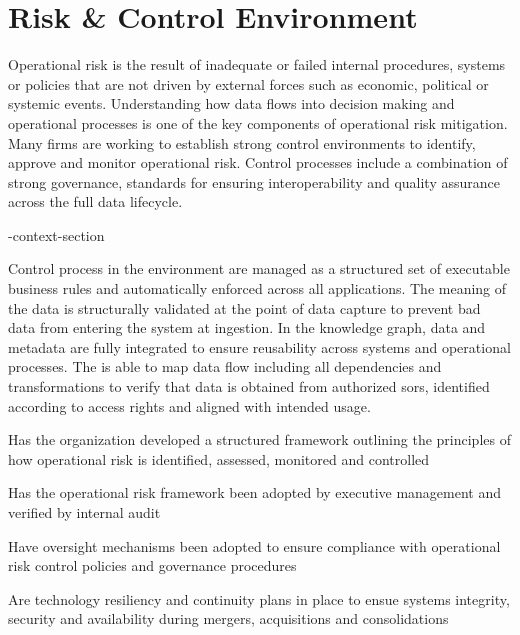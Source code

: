 \section{Risk \& Control Environment}\label{sec:ekgmm-b-4-6} %

Operational risk is the result of inadequate or failed internal procedures,
systems or policies that are not driven by external forces such as economic, political or systemic events.
Understanding how data flows into decision making and operational processes is one of the key components of
operational risk mitigation.
Many firms are working to establish strong control environments to identify, approve and monitor operational risk.
Control processes include a combination of strong governance, standards for ensuring interoperability and
quality assurance across the full data lifecycle.

\ekgmm-context-section

Control process in the  environment are managed as a structured set of executable business rules
and automatically enforced across all applications.
The meaning of the data is structurally validated at the point of data capture to prevent bad data from
entering the system at ingestion.
In the knowledge graph, data and metadata are fully integrated to ensure reusability across systems
and operational processes.
The  is able to map data flow including all dependencies and transformations to verify that
data is obtained from authorized \glspl{sor}, identified according to access rights and
aligned with intended usage.

\kgmmcorequestionssection

\begin{core-questions}

  \item [\thesection.1] Has the organization developed a structured framework outlining the principles of how
                        operational risk is identified, assessed, monitored and controlled
  \item [\thesection.2] Has the operational risk framework been adopted by executive management and verified by
                        internal audit
  \item [\thesection.3] Have oversight mechanisms been adopted to ensure compliance with operational risk
                        control policies and governance procedures
  \item [\thesection.4] Are technology resiliency and continuity plans in place to ensue systems integrity,
                        security and availability during mergers, acquisitions and consolidations

\end{core-questions}

